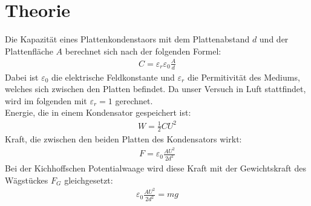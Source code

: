 \documentclass[12pt,a4paper,titlepage,headinclude,bibtotoc]{scrartcl}
\begin{document}
\section{Theorie}
\label{sec:theorie}
Die Kapazität eines Plattenkondenstaors mit dem Plattenabstand $d$ und der Plattenfläche $A$ berechnet sich nach der folgenden Formel:
\begin{align}
 C=\varepsilon_r\varepsilon_0\frac{A}{d}
 \label{eq:C_Pl}
\end{align}
Dabei ist $\varepsilon_0$ die elektrische Feldkonstante und $\varepsilon_r$ die Permitivität des Mediums, welches sich zwischen den Platten befindet.
Da unser Versuch in Luft stattfindet, wird im folgenden mit $\varepsilon_r=1$ gerechnet.\\
Energie, die in einem Kondensator gespeichert ist:
\begin{align}
 W=\frac{1}{2} C U^2
\end{align}
Kraft, die zwischen den beiden Platten des Kondensators wirkt:
\begin{align}
 F=\varepsilon_0\frac{A U^2}{2 d^2}
 \label{eq:F_Pl}
\end{align}
Bei der Kichhoffschen Potentialwaage wird diese Kraft mit der Gewichtskraft des Wägstückes $F_G$ gleichgesetzt:
\begin{align}
 \varepsilon_0\frac{A U^2}{2 d^2}=mg
 \label{eq:PotWaage}
\end{align}
\end{document}
